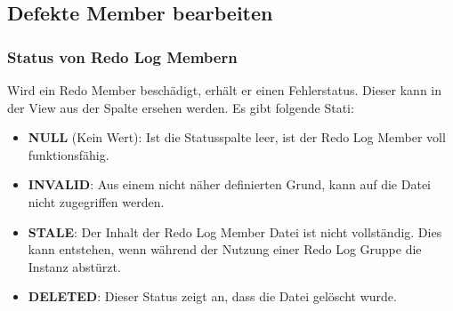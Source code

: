       \subsection{Defekte Member bearbeiten}
        \subsubsection{Status von Redo Log Membern}
          Wird ein Redo Member besch\"adigt, erh\"alt er einen Fehlerstatus. Dieser kann in der View  aus der Spalte  ersehen werden. Es gibt folgende Stati:
          \begin{itemize}
          \item \textbf{NULL} (Kein Wert): Ist die Statusspalte leer, ist der Redo Log Member voll funktionsf\"ahig.
          \item \textbf{INVALID}: Aus einem nicht n\"aher definierten Grund, kann auf die Datei nicht zugegriffen werden.
          \item \textbf{STALE}: Der Inhalt der Redo Log Member Datei ist nicht vollst\"andig. Dies kann entstehen, wenn w\"ahrend der Nutzung einer Redo Log Gruppe die Instanz abst\"urzt.
          \item \textbf{DELETED}: Dieser Status zeigt an, dass die Datei gel\"oscht wurde.
        \end{itemize}
\clearpage
